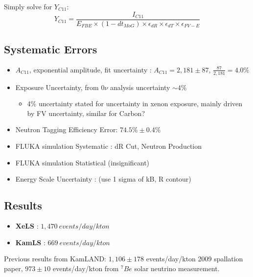 \documentclass[12pt,letterpaper]{article}
\begin{document}
Simply solve for $Y_{C11}$:
\begin{equation}
	Y_{C11} = \frac{I_{C11}}{E_{FBE} \times (1-dt_{MoG}) \times \epsilon_{dR} \times \epsilon_{dT} \times \epsilon_{FV-E}}
\end{equation}

\subsection*{Systematic Errors}
\begin{itemize}
	\item $A_{C11}$, exponential amplitude, fit uncertainty : $A_{C11}=2,181\pm87$, $\frac{87}{2,181}=4.0\%$
	\item Exposure Uncertainty, from $0\nu$ analysis uncertainty $\sim 4\%$
	\begin{itemize}
		\item 4\% uncertainty stated for uncertainty in xenon exposure, mainly driven by FV uncertainty, similar for Carbon?
	\end{itemize}
	\item Neutron Tagging Efficiency Error: $74.5\%\pm0.4\%$
	\item FLUKA simulation Systematic : dR Cut, Neutron Production
	\item FLUKA simulation Statistical (insignificant)
	\item Energy Scale Uncertainty : (use 1 sigma of kB, R contour)
\end{itemize}

\subsection*{Results}
\begin{itemize}
	\item \textbf{XeLS} : $1,470\ events/day/kton$
	\item \textbf{KamLS} : $669\ events/day/kton$
\end{itemize}

Previous results from KamLAND: $1,106\pm178$ events/day/kton 2009 spallation paper, $973\pm10$ events/day/kton from $^{7}Be$ solar neutrino measurement.
\end{document}
